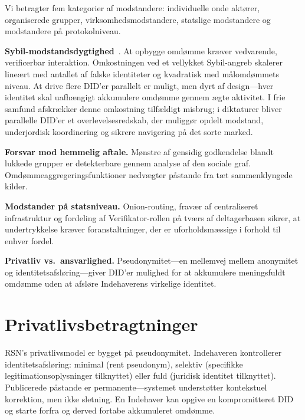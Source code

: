 \documentclass[11pt,a4paper,twocolumn]{article}
\begin{document}
Vi betragter fem kategorier af modstandere: individuelle onde aktører, organiserede grupper, virksomhedsmodstandere, statslige modstandere og modstandere på protokolniveau.

\textbf{Sybil-modstandsdygtighed}~\cite{douceur2002}. At opbygge omdømme kræver vedvarende, verificerbar interaktion. Omkostningen ved et vellykket Sybil-angreb skalerer lineært med antallet af falske identiteter og kvadratisk med målomdømmets niveau. At drive flere DID'er parallelt er muligt, men dyrt af design---hver identitet skal uafhængigt akkumulere omdømme gennem ægte aktivitet. I frie samfund afskrækker denne omkostning tilfældigt misbrug; i diktaturer bliver parallelle DID'er et overlevelsesredskab, der muliggør opdelt modstand, underjordisk koordinering og sikrere navigering på det sorte marked.

\textbf{Forsvar mod hemmelig aftale.} Mønstre af gensidig godkendelse blandt lukkede grupper er detekterbare gennem analyse af den sociale graf. Omdømmeaggregeringsfunktioner nedvægter påstande fra tæt sammenklyngede kilder.

\textbf{Modstander på statsniveau.} Onion-routing, fravær af centraliseret infrastruktur og fordeling af Verifikator-rollen på tværs af deltagerbasen sikrer, at undertrykkelse kræver foranstaltninger, der er uforholdsmæssige i forhold til enhver fordel.

\textbf{Privatliv vs.\ ansvarlighed.} Pseudonymitet---en mellemvej mellem anonymitet og identitetsafsløring---giver DID'er mulighed for at akkumulere meningsfuldt omdømme uden at afsløre Indehaverens virkelige identitet.

\section{Privatlivsbetragtninger}

RSN's privatlivsmodel er bygget på pseudonymitet. Indehaveren kontrollerer identitetsafsløring: minimal (rent pseudonym), selektiv (specifikke legitimationsoplysninger tilknyttet) eller fuld (juridisk identitet tilknyttet). Publicerede påstande er permanente---systemet understøtter kontekstuel korrektion, men ikke sletning. En Indehaver kan opgive en kompromitteret DID og starte forfra og derved fortabe akkumuleret omdømme.

\end{document}
